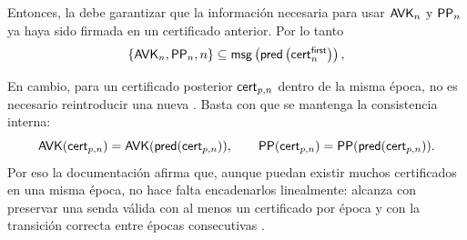 Entonces, la \CertificateChain debe garantizar que la información necesaria para usar $\mathsf{AVK}_n$ y $\mathsf{PP}_n$ ya haya sido firmada en un certificado anterior. Por lo tanto
$$\{\mathsf{AVK}_n,\mathsf{PP}_n,n\} \subseteq \mathsf{msg} \left(\mathsf{pred}\left(\mathsf{cert}^{\mathsf{first}}_{n}\right)\right),
$$

En cambio, para un certificado posterior $\mathsf{cert}_{p,n}$ dentro de la misma época, no es necesario reintroducir una nueva \AVK. Basta con que se mantenga la consistencia interna:
$$
\mathsf{AVK}(\mathsf{cert}_{p,n}) = \mathsf{AVK}(\mathsf{pred}(\mathsf{cert}_{p,n})), \qquad \mathsf{PP}(\mathsf{cert}_{p,n}) = \mathsf{PP}(\mathsf{pred}(\mathsf{cert}_{p,n})).
$$
Por eso la documentación afirma que, aunque puedan existir muchos certificados en una misma época, no hace falta encadenarlos linealmente: alcanza con preservar una senda válida con al menos un certificado por época y con la transición correcta entre épocas consecutivas \cite{MithrilDocsCertChain}.

